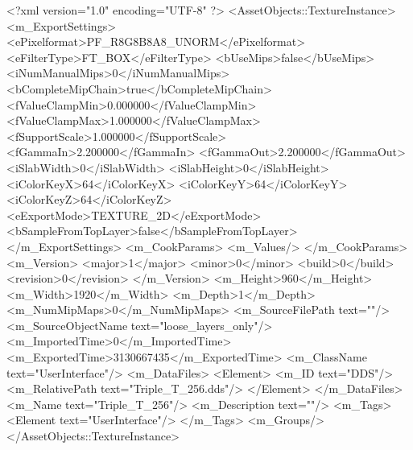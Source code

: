 <?xml version="1.0" encoding="UTF-8" ?>
<AssetObjects::TextureInstance>
	<m_ExportSettings>
		<ePixelformat>PF_R8G8B8A8_UNORM</ePixelformat>
		<eFilterType>FT_BOX</eFilterType>
		<bUseMips>false</bUseMips>
		<iNumManualMips>0</iNumManualMips>
		<bCompleteMipChain>true</bCompleteMipChain>
		<fValueClampMin>0.000000</fValueClampMin>
		<fValueClampMax>1.000000</fValueClampMax>
		<fSupportScale>1.000000</fSupportScale>
		<fGammaIn>2.200000</fGammaIn>
		<fGammaOut>2.200000</fGammaOut>
		<iSlabWidth>0</iSlabWidth>
		<iSlabHeight>0</iSlabHeight>
		<iColorKeyX>64</iColorKeyX>
		<iColorKeyY>64</iColorKeyY>
		<iColorKeyZ>64</iColorKeyZ>
		<eExportMode>TEXTURE_2D</eExportMode>
		<bSampleFromTopLayer>false</bSampleFromTopLayer>
	</m_ExportSettings>
	<m_CookParams>
		<m_Values/>
	</m_CookParams>
	<m_Version>
		<major>1</major>
		<minor>0</minor>
		<build>0</build>
		<revision>0</revision>
	</m_Version>
	<m_Height>960</m_Height>
	<m_Width>1920</m_Width>
	<m_Depth>1</m_Depth>
	<m_NumMipMaps>0</m_NumMipMaps>
	<m_SourceFilePath text=""/>
	<m_SourceObjectName text="loose_layers_only"/>
	<m_ImportedTime>0</m_ImportedTime>
	<m_ExportedTime>3130667435</m_ExportedTime>
	<m_ClassName text="UserInterface"/>
	<m_DataFiles>
		<Element>
			<m_ID text="DDS"/>
			<m_RelativePath text="Triple_T_256.dds"/>
		</Element>
	</m_DataFiles>
	<m_Name text="Triple_T_256"/>
	<m_Description text=""/>
	<m_Tags>
		<Element text="UserInterface"/>
	</m_Tags>
	<m_Groups/>
</AssetObjects::TextureInstance>

